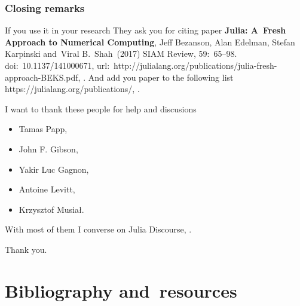 \documentclass{beamer}  %
\begin{document}
\begin{frame}
  \frametitle{Closing remarks}

  \begin{block}{If you use it in your research}
    They ask you for citing paper \textbf{Julia: A~Fresh Approach to
      Numerical Computing}, Jeff Bezanson, Alan Edelman, Stefan
    Karpinski and~Viral B.~Shah~(2017) SIAM Review, 59:~65--98.
    doi:~10.1137/141000671,
    url:~http://julialang.org/publications/julia-fresh-approach-BEKS.pdf,
    .
    And add you paper to the following list
    https://julialang.org/publications/,
    .
  \end{block}

  \begin{block}{I want to thank these people for help and discusions}
    \begin{itemize}
    \item Tamas Papp,
    \item John F. Gibson,
    \item Yakir Luc Gagnon,
    \item Antoine Levitt,
    \item Krzysztof Musiał.
    \end{itemize}
    With most of them I converse on Julia Discourse,
    .
  \end{block}

\end{frame}





\begin{frame}

  \begin{center}
    \LARGE Thank you.
  \end{center}

\end{frame}





\section[]{Bibliography and~resources}
\end{document}
